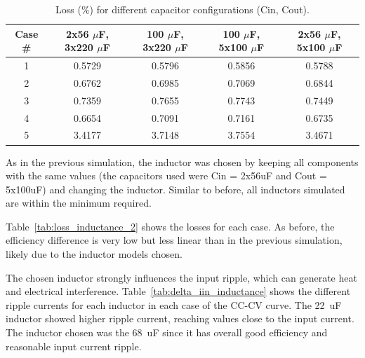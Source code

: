         
        \begin{table}[!ht]
            \caption{Loss (\%) for different capacitor configurations (Cin, Cout).}
            \centering
            \begin{tabular}{|c|cccc|}
            \hline
            \textbf{Case \#} & \textbf{2x56 $\mu$F, 3x220 $\mu$F} & \textbf{100 $\mu$F, 3x220 $\mu$F} & \textbf{100 $\mu$F, 5x100 $\mu$F} & \textbf{2x56 $\mu$F, 5x100 $\mu$F} \\
            \hline
            1 & 0.5729 & 0.5796 & 0.5856 & 0.5788 \\
            2 & 0.6762 & 0.6985 & 0.7069 & 0.6844 \\
            3 & 0.7359 & 0.7655 & 0.7743 & 0.7449 \\
            4 & 0.6654 & 0.7091 & 0.7161 & 0.6735 \\
            5 & 3.4177 & 3.7148 & 3.7554 & 3.4671 \\
            \hline
            \end{tabular}
            
            \label{tab:loss_capacitors_2}
        \end{table}

        As in the previous simulation, the inductor was chosen by keeping all components with the same values (the capacitors used were Cin = 2x56uF and Cout = 5x100uF) and changing the inductor. Similar to before, all inductors simulated are within the minimum required.

        Table~\ref{tab:loss_inductance_2} shows the losses for each case. As before, the efficiency difference is very low but less linear than in the previous simulation, likely due to the inductor models chosen.

        The chosen inductor strongly influences the input ripple, which can generate heat and electrical interference. Table~\ref{tab:delta_iin_inductance} shows the different ripple currents for each inductor in each case of the CC-CV curve. The 22~uF inductor showed higher ripple current, reaching values close to the input current. The inductor chosen was the 68~uF since it has overall good efficiency and reasonable input current ripple.


